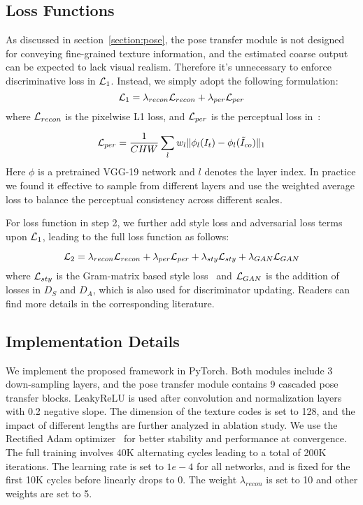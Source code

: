 \documentclass{article}
\begin{document}
\subsection{Loss Functions}
As discussed in section~\ref{section:pose}, the pose transfer module is not designed for conveying fine-grained texture information, and the estimated coarse output can be expected to lack visual realism. Therefore it's unnecessary to enforce discriminative loss in ${\cal L}_1$. Instead, we simply adopt the following formulation:
$${\cal L}_1 = \lambda_{recon}{\cal L}_{recon} + \lambda_{per}{\cal L}_{per}$$
where ${\cal L}_{recon}$ is the pixelwise L1 loss, and ${\cal L}_{per}$ is the perceptual loss in~\cite{PerceptualLoss}:

$${\cal L}_{per} = \frac{1}{CHW}\sum_{l}w_l\|\phi_l(I_t) - \phi_l(\tilde{I}_{co})\|_1$$
Here $\phi$ is a pretrained VGG-19 network and $l$ denotes the layer index. In practice we found it effective to sample from different layers and use the weighted average loss to balance the perceptual consistency across different scales.

For loss function in step 2, we further add style loss and adversarial loss terms upon ${\cal L}_1$, leading to the full loss function as follows:

$${\cal L}_2 = \lambda_{recon}{\cal L}_{recon} + \lambda_{per}{\cal L}_{per} + \lambda_{sty}{\cal L}_{sty} + \lambda_{GAN}{\cal L}_{GAN} $$
where ${\cal L}_{sty}$ is the Gram-matrix based style loss~\cite{PerceptualLoss} and ${\cal L}_{GAN}$ is the addition of losses in $D_S$ and $D_A$, which is also used for discriminator updating. Readers can find more details in the corresponding literature.

\subsection{Implementation Details}
We implement the proposed framework in PyTorch. Both modules include 3 down-sampling layers, and the pose transfer module contains 9 cascaded pose transfer blocks. LeakyReLU is used after convolution and normalization layers with 0.2 negative slope. The dimension of the texture codes is set to 128, and the impact of different lengths are further analyzed in ablation study. We use the Rectified Adam optimizer~\cite{radam} for better stability and performance at convergence. The full training involves 40K alternating cycles leading to a total of 200K iterations. The learning rate is set to $1e-4$ for all networks, and is fixed for the first 10K cycles before linearly drops to 0. The weight $\lambda_{recon}$ is set to 10 and other weights are set to 5.
\end{document}
